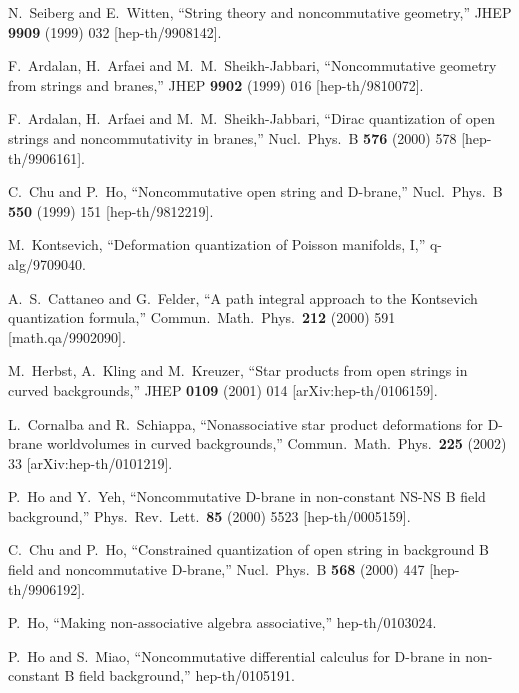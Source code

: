 \documentclass[a4paper,11pt]{article}               \def\new#1\endnew{{\bf #1}}
\begin{document}
N.~Seiberg and E.~Witten,
``String theory and noncommutative geometry,''
JHEP {\bf 9909} (1999) 032
[hep-th/9908142].

F.~Ardalan, H.~Arfaei and M.~M.~Sheikh-Jabbari,
``Noncommutative geometry from strings and branes,''
JHEP {\bf 9902} (1999) 016
[hep-th/9810072].

F.~Ardalan, H.~Arfaei and M.~M.~Sheikh-Jabbari,
``Dirac quantization of open strings and noncommutativity in branes,''
Nucl.\ Phys.\ B {\bf 576} (2000) 578
[hep-th/9906161].

C.~Chu and P.~Ho,
``Noncommutative open string and D-brane,''
Nucl.\ Phys.\ B {\bf 550} (1999) 151
[hep-th/9812219].

M.~Kontsevich,
``Deformation quantization of Poisson manifolds, I,''
q-alg/9709040.

A.~S.~Cattaneo and G.~Felder,
``A path integral approach to the Kontsevich quantization formula,''
Commun.\ Math.\ Phys.\  {\bf 212} (2000) 591
[math.qa/9902090].

M.~Herbst, A.~Kling and M.~Kreuzer,
``Star products from open strings in curved backgrounds,''
JHEP {\bf 0109} (2001) 014
[arXiv:hep-th/0106159].

L.~Cornalba and R.~Schiappa,
``Nonassociative star product deformations for D-brane worldvolumes in curved 
backgrounds,''
Commun.\ Math.\ Phys.\  {\bf 225} (2002) 33
[arXiv:hep-th/0101219].

P.~Ho and Y.~Yeh,
``Noncommutative D-brane in non-constant NS-NS B field background,''
Phys.\ Rev.\ Lett.\  {\bf 85} (2000) 5523
[hep-th/0005159].

C.~Chu and P.~Ho,
``Constrained quantization of open string in background B field and  
noncommutative D-brane,''
Nucl.\ Phys.\ B {\bf 568} (2000) 447
[hep-th/9906192].

P.~Ho,
``Making non-associative algebra associative,''
hep-th/0103024.

P.~Ho and S.~Miao,
``Noncommutative differential calculus for D-brane in non-constant B  
field background,''
hep-th/0105191.
\end{document}
